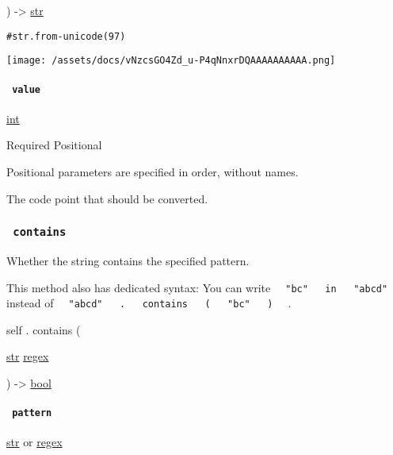 ) -\textgreater{} \href{/docs/reference/foundations/str/}{str}

\begin{verbatim}
#str.from-unicode(97)
\end{verbatim}

\texttt{[image: /assets/docs/vNzcsGO4Zd\_u-P4qNnxrDQAAAAAAAAAA.png]}

\paragraph{\texorpdfstring{\texttt{\ value\ }}{ value }}\label{definitions-from-unicode-value}

\href{/docs/reference/foundations/int/}{int}

{Required} {{ Positional }}

\label{definitions-from-unicode-value-positional-tooltip}
Positional parameters are specified in order, without names.

The code point that should be converted.

\subsubsection{\texorpdfstring{\texttt{\ contains\ }}{ contains }}\label{definitions-contains}

Whether the string contains the specified pattern.

This method also has dedicated syntax: You can write
\texttt{\ }{\texttt{\ "bc"\ }}\texttt{\ }{\texttt{\ in\ }}\texttt{\ }{\texttt{\ "abcd"\ }}\texttt{\ }
instead of
\texttt{\ }{\texttt{\ "abcd"\ }}\texttt{\ }{\texttt{\ .\ }}\texttt{\ }{\texttt{\ contains\ }}\texttt{\ }{\texttt{\ (\ }}\texttt{\ }{\texttt{\ "bc"\ }}\texttt{\ }{\texttt{\ )\ }}\texttt{\ }
.

self { . } { contains } (

{ \href{/docs/reference/foundations/str/}{str}
\href{/docs/reference/foundations/regex/}{regex} }

) -\textgreater{} \href{/docs/reference/foundations/bool/}{bool}

\paragraph{\texorpdfstring{\texttt{\ pattern\ }}{ pattern }}\label{definitions-contains-pattern}

\href{/docs/reference/foundations/str/}{str} {or}
\href{/docs/reference/foundations/regex/}{regex}

